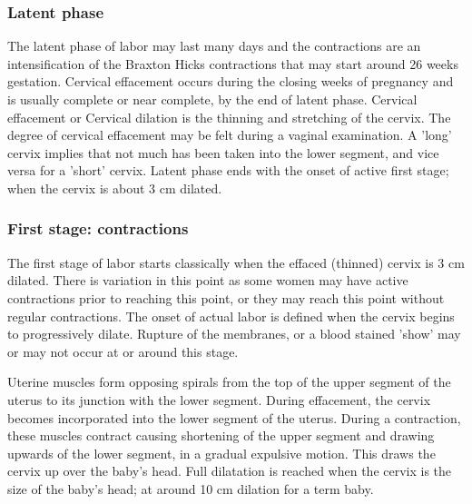 \documentclass[12pt,a4paper,onecolumn]{article}
\begin{document}
\subsubsection{Latent phase}

The latent phase of labor may last many days and the contractions are an intensification of the
Braxton Hicks contractions that may start around 26 weeks gestation. Cervical effacement occurs
during the closing weeks of pregnancy and is usually complete or near complete, by the end of latent
phase. Cervical effacement or Cervical dilation is the thinning and stretching of the cervix. The
degree of cervical effacement may be felt during a vaginal examination. A 'long' cervix implies that
not much has been taken into the lower segment, and vice versa for a 'short' cervix. Latent phase
ends with the onset of active first stage; when the cervix is about 3 cm dilated.

\subsubsection{First stage: contractions}

The first stage of labor starts classically when the effaced (thinned) cervix is 3 cm dilated. There
is variation in this point as some women may have active contractions prior to reaching this point,
or they may reach this point without regular contractions. The onset of actual labor is defined when
the cervix begins to progressively dilate. Rupture of the membranes, or a blood stained 'show' may
or may not occur at or around this stage.

Uterine muscles form opposing spirals from the top of the upper segment of the uterus to its
junction with the lower segment. During effacement, the cervix becomes incorporated into the lower
segment of the uterus. During a contraction, these muscles contract causing shortening of the upper
segment and drawing upwards of the lower segment, in a gradual expulsive motion. This draws the
cervix up over the baby's head. Full dilatation is reached when the cervix is the size of the baby's
head; at around 10 cm dilation for a term baby.
\end{document}
